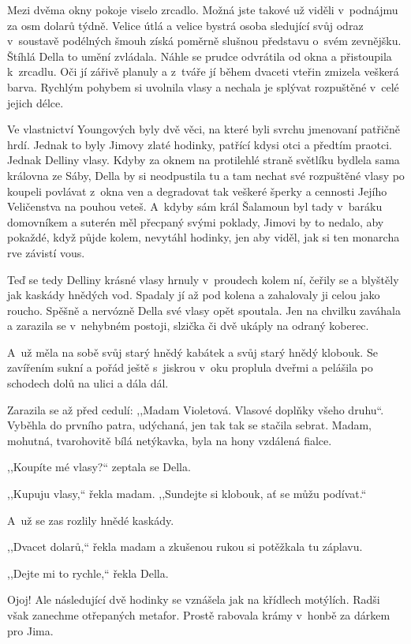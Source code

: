 Mezi dvěma okny pokoje viselo zrcadlo. Možná jste takové už viděli v podnájmu za osm dolarů týdně. Velice útlá a velice bystrá osoba sledující svůj odraz v soustavě podélných šmouh získá poměrně slušnou představu o~svém zevnějšku. Štíhlá Della to umění zvládala.
Náhle se prudce odvrátila od okna a přistoupila k zrcadlu. Oči jí zářivě planuly a z tváře jí během dvaceti vteřin zmizela veškerá barva. Rychlým pohybem si uvolnila vlasy a nechala je splývat rozpuštěné v celé jejich délce.

Ve vlastnictví Youngových byly dvě věci, na které byli svrchu jmenovaní patřičně hrdí. Jednak to byly Jimovy zlaté hodinky, patřící kdysi otci a předtím praotci. Jednak Delliny vlasy. Kdyby za oknem na protilehlé straně světlíku bydlela sama královna ze Sáby, Della by si neodpustila tu a tam nechat své rozpuštěné vlasy po koupeli povlávat z okna ven a degradovat tak veškeré šperky a cennosti Jejího Veličenstva na pouhou veteš. A~kdyby sám král Šalamoun byl tady v baráku domovníkem a suterén měl přecpaný svými poklady, Jimovi by to nedalo, aby pokaždé, když půjde kolem, nevytáhl hodinky, jen aby viděl, jak si ten monarcha rve závistí vous.

Teď se tedy Delliny krásné vlasy hrnuly v proudech kolem ní, čeřily se a blyštěly jak kaskády hnědých vod. Spadaly jí až pod kolena a zahalovaly ji celou jako roucho. Spěšně a nervózně Della své vlasy opět spoutala. Jen na chvilku zaváhala a zarazila se v nehybném postoji, slzička či dvě ukáply na odraný koberec.

A~už měla na sobě svůj starý hnědý kabátek a svůj starý hnědý klobouk. Se zavířením sukní a pořád ještě s jiskrou v oku proplula dveřmi a pelášila po schodech dolů na ulici a dála dál.

Zarazila se až před cedulí: ,,Madam Violetová. Vlasové doplňky všeho druhu``. Vyběhla do prvního patra, udýchaná, jen tak tak se stačila sebrat. Madam, mohutná, tvarohovitě bílá netýkavka, byla na hony vzdálená fialce.

,,Koupíte mé vlasy?`` zeptala se Della.

,,Kupuju vlasy,`` řekla madam. ,,Sundejte si klobouk, ať se můžu podívat.``

A~už se zas rozlily hnědé kaskády.

,,Dvacet dolarů,`` řekla madam a zkušenou rukou si potěžkala tu záplavu.

,,Dejte mi to rychle,`` řekla Della.

Ojoj! Ale následující dvě hodinky se vznášela jak na křídlech motýlích. Radši však zanechme otřepaných metafor. Prostě rabovala krámy v honbě za dárkem pro Jima.

